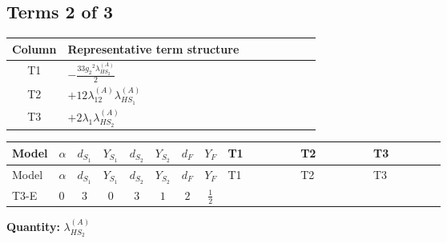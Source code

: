 \documentclass[8pt]{article}
\begin{document}
\begin{landscape}
\subsection*{Terms 2 of 3}
\begin{center}
\begin{tabular}{@{}c >{\raggedright\arraybackslash}p{0.82\linewidth}@{}}
\toprule
Column & Representative term structure \\
\midrule
T1 & \(\displaystyle -\frac{33 {g_2}^2 {\lambda_{HS_2}^{(A)}}}{2}\) \\
\midrule
T2 & \(\displaystyle +12 {\lambda_{12}^{(A)}} {\lambda_{HS_1}^{(A)}}\) \\
\midrule
T3 & \(\displaystyle +2 {\lambda_1} {\lambda_{HS_2}^{(A)}}\) \\
\midrule
\bottomrule
\end{tabular}
\end{center}
\smallskip
\tiny
\begin{longtable}{@{}llcccccc >{\raggedright\arraybackslash}p{0.21\linewidth} >{\raggedright\arraybackslash}p{0.21\linewidth} >{\raggedright\arraybackslash}p{0.21\linewidth}@{}}
\toprule
Model & $\alpha$ & $d_{S_1}$ & $Y_{S_1}$ & $d_{S_2}$ & $Y_{S_2}$ & $d_F$ & $Y_F$ & T1 & T2 & T3 \\
\midrule
\endfirsthead
\toprule
Model & $\alpha$ & $d_{S_1}$ & $Y_{S_1}$ & $d_{S_2}$ & $Y_{S_2}$ & $d_F$ & $Y_F$ & T1 & T2 & T3 \\
\midrule
\endhead
T3-E & $0$ & $3$ & $0$ & $3$ & $1$ & $2$ & $\frac{1}{2}$ & \scriptsize\adjustbox{max width=\linewidth}{$\begin{gathered} -\frac{33 {g_2}^2 {\lambda_{HS_2}^{(A)}}}{2}\end{gathered}$} & \scriptsize\adjustbox{max width=\linewidth}{$\begin{gathered} +12 {\lambda_{12}^{(A)}} {\lambda_{HS_1}^{(A)}}\end{gathered}$} & \scriptsize\adjustbox{max width=\linewidth}{$\begin{gathered} +2 {\lambda_1} {\lambda_{HS_2}^{(A)}}\end{gathered}$} \\
\midrule
\bottomrule
\end{longtable}
\clearpage
\noindent\textbf{Quantity: }$\lambda_{HS_2}^{(A)}$\par\smallskip

\end{landscape}
\end{document}
